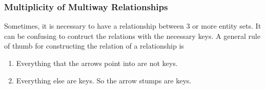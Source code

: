   \subsubsection{Multiplicity of Multiway Relationships}

    Sometimes, it is necessary to have a relationship between 3 or more entity sets. It can be confusing to contruct the relations with the necessary keys. A general rule of thumb for constructing the relation of a relationship is 
    \begin{enumerate}
      \item Everything that the arrows point into are not keys.   
      \item Everything else are keys. So the arrow stumps are keys. 
    \end{enumerate}

